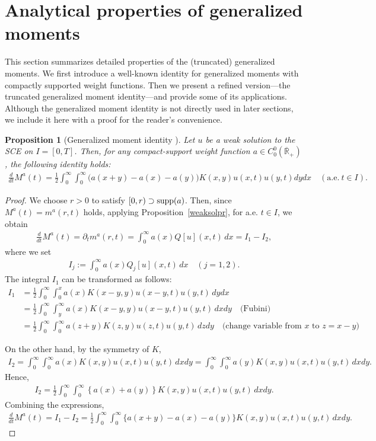 \documentclass[a4paper,11pt]{article}
\newtheorem{prop}[thm]{Proposition}
\def\Rb{\overline{{\mathbb R}}_+}
\def\supp{\mbox{\rm supp}}
\begin{document}
\section{Analytical properties of generalized moments}\label{sec:4}
\setcounter{equation}{0}
This section summarizes detailed properties of the (truncated) generalized moments.
We first introduce a well-known identity for generalized moments with compactly supported weight functions. Then we present a refined version—the truncated generalized moment identity—and provide some of its applications.
Although the generalized moment identity is not directly used in later sections, we include it here with a proof for the reader's convenience.

\begin{prop}[Generalized moment identity \cite{Pego2009}]
Let $u$ be a weak solution to the SCE on $I=[0,T]$.
Then, for any compact-support weight function $a\in C^0_0(\Rb )$, the following identity holds:
\begin{align*}
\frac{d}{dt}M^{a}(t)=\frac{1}{2}\int_{0}^{\infty}\int_{0}^{\infty}
\big(a(x+y)-a(x)-a(y)\big)K(x,y)u(x,t)u(y,t)dydx
\quad (\text{a.e.}~t\in I).
\end{align*}
\end{prop}
\begin{proof}
We choose $r>0$ to satisfy $[0,r)\supset \supp (a)$.
Then, since $M^a(t)=m^a(r,t)$ holds, 
applying Proposition~\ref{weaksolpr}, for a.e. $t\in I$, we obtain
\begin{align*}
\frac{d}{dt}M^a(t)
=
\partial_tm^a(r,t)
=\int^\infty_0 a(x)Q[u](x,t)\, dx 
=I_1-I_2,
\end{align*}
where we set
\begin{align*}
I_j:=\int_{0}^\infty a(x)Q_j[u](x,t)\,dx
\quad (j=1,2).
\end{align*}
The integral $I_1$ can be transformed as follows:
\begin{align*}
I_1&=\frac{1}{2}\int^\infty_0 \int^x_0 a(x)K(x-y,y)u(x-y,t)u(y,t)\,dydx\\
&=\frac{1}{2}\int_0^\infty \int_y^\infty a(x)K(x-y,y)u(x-y,t)u(y,t)\,dxdy\quad\mbox{(Fubini)}\\
&=\frac{1}{2}\int_0^\infty \int_0^\infty a(z+y)K(z,y)u(z,t)u(y,t)\,dzdy\quad\mbox{(change variable from $x$ to $z=x-y$)}
\end{align*}

On the other hand, by the symmetry of $K$, 
\begin{align*}
I_2 = \int^\infty_0 \int^\infty_0 a(x)K(x,y)u(x,t)u(y,t)\,dxdy
= \int^\infty_0 \int^\infty_0 a(y)K(x,y)u(x,t)u(y,t)\,dxdy.
\end{align*}
Hence,
\begin{align*}
I_2 = \frac{1}{2}\int^\infty_0  \int^\infty_0 \left\{a(x)+a(y)\right\}K(x,y)u(x,t)u(y,t)\,dxdy.
\end{align*}
Combining the expressions,
\begin{align*}
\frac{d}{dt}M^a(t) =I_1-I_2=\frac{1}{2}\int^\infty_0\int^\infty_0\{a(x+y)-a(x)-a(y)\}K(x,y)u(x,t)u(y,t)\,dxdy.
\end{align*}
\end{proof}
\end{document}
